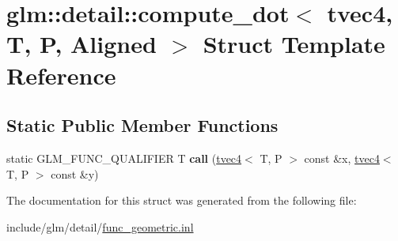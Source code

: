 \hypertarget{structglm_1_1detail_1_1compute__dot_3_01tvec4_00_01T_00_01P_00_01Aligned_01_4}{}\section{glm\+:\+:detail\+:\+:compute\+\_\+dot$<$ tvec4, T, P, Aligned $>$ Struct Template Reference}
\label{structglm_1_1detail_1_1compute__dot_3_01tvec4_00_01T_00_01P_00_01Aligned_01_4}
\subsection*{Static Public Member Functions}
\begin{DoxyCompactItemize}
\item 
\mbox{\label{structglm_1_1detail_1_1compute__dot_3_01tvec4_00_01T_00_01P_00_01Aligned_01_4_a8b84c266bcc2ab21f1aba8a1c1c3bdf7}} 
static G\+L\+M\+\_\+\+F\+U\+N\+C\+\_\+\+Q\+U\+A\+L\+I\+F\+I\+ER T {\bfseries call} (\hyperlink{structglm_1_1tvec4}{tvec4}$<$ T, P $>$ const \&x, \hyperlink{structglm_1_1tvec4}{tvec4}$<$ T, P $>$ const \&y)
\end{DoxyCompactItemize}


The documentation for this struct was generated from the following file\+:\begin{DoxyCompactItemize}
\item 
include/glm/detail/\hyperlink{func__geometric_8inl}{func\+\_\+geometric.\+inl}\end{DoxyCompactItemize}
